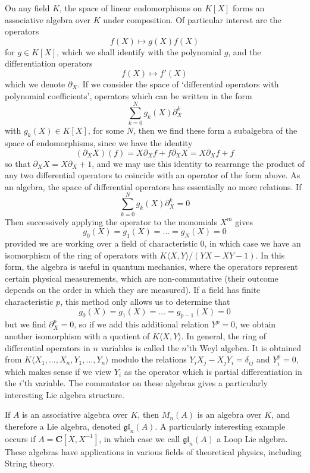 \begin{example}
    On any field $K$, the space of linear endomorphisms on $K[X]$ forms an associative algebra over $K$ under composition. Of particular interest are the operators
    \[ f(X) \mapsto g(X) f(X) \]
    for $g \in K[X]$, which we shall identify with the polynomial $g$, and the differentiation operators
    \[ f(X) \mapsto f'(X) \]
    which we denote $\partial_X$. If we consider the space of `differential operators with polynomial coefficients', operators which can be written in the form
    \[ \sum_{k = 0}^N g_k(X) \partial_X^k \]
    with $g_k(X) \in K[X]$, for some $N$, then we find these form a subalgebra of the space of endomorphisms, since we have the identity
    \[ (\partial_X X)(f) = X \partial_X f + f \partial_X X = X \partial_X f + f \]
    so that $\partial_X X = X \partial_X + 1$, and we may use this identity to rearrange the product of any two differential operators to coincide with an operator of the form above. As an algebra, the space of differential operators has essentially no more relations. If
    \[ \sum_{k = 0}^N g_k(X) \partial_X^k = 0 \]
    Then successively applying the operator to the monomials $X^m$ gives
    \[ g_0(X) = g_1(X) = \dots = g_N(X) = 0 \]
    provided we are working over a field of characteristic 0, in which case we have an isomorphism of the ring of operators with $K \langle X, Y \rangle / (YX - XY - 1)$. In this form, the algebra is useful in quantum mechanics, where the operators represent certain physical measurements, which are non-commutative (their outcome depends on the order in which they are measured). If a field has finite characteristic $p$,  this method only allows us to determine that
    \[ g_0(X) = g_1(X) = \dots = g_{p-1}(X) = 0 \]
    but we find $\partial_X^p = 0$, so if we add this additional relation $Y^p = 0$, we obtain another isomorphism with a quotient of $K \langle X, Y \rangle$. In general, the ring of differential operators in $n$ variables is called the $n$'th Weyl algebra. It is obtained from $K\langle X_1, \dots, X_n, Y_1, \dots, Y_n \rangle$ modulo the relations $Y_i X_j - X_j Y_i = \delta_{ij}$ and $Y_i^p = 0$, which makes sense if we view $Y_i$ as the operator which is partial differentiation in the $i$'th variable. The commutator on these algebras gives a particularly interesting Lie algebra structure.
\end{example}

\begin{example}
    If $A$ is an associative algebra over $K$, then $M_n(A)$ is an algebra over $K$, and therefore a Lie algebra, denoted $\mathfrak{gl}_n(A)$. A particularly interesting example occurs if $A = \mathbf{C}[X,X^{-1}]$, in which case we call $\mathfrak{gl}_n(A)$ a Loop Lie algebra. These algebras have applications in various fields of theoretical physics, including String theory.
\end{example}

